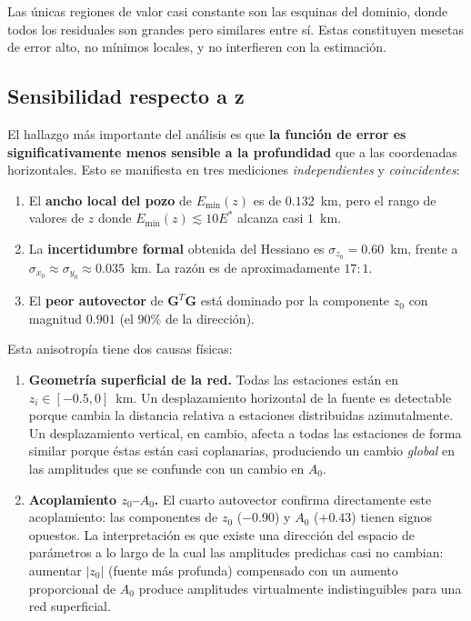 \documentclass[12pt, a4paper]{article}
\begin{document}
Las únicas regiones de valor casi constante son las esquinas del
dominio, donde todos los residuales son grandes pero similares entre
sí. Estas constituyen mesetas de error alto, no mínimos locales, y no
interfieren con la estimación.

\subsection{Sensibilidad respecto a z}
\label{sec:sensibilidad_z}

El hallazgo más importante del análisis es que \textbf{la función de
error es significativamente menos sensible a la profundidad} que a las
coordenadas horizontales. Esto se manifiesta en tres mediciones
\emph{independientes} y \emph{coincidentes}:

\begin{enumerate}[leftmargin=*, itemsep=2pt]
    \item El \textbf{ancho local del pozo} de $E_{\min}(z)$ es de
    $0.132$~km, pero el rango de valores de $z$ donde
    $E_{\min}(z) \lesssim 10 E^*$ alcanza casi $1$~km.
    \item La \textbf{incertidumbre formal} obtenida del Hessiano es
    $\sigma_{z_0} = 0.60$~km, frente a $\sigma_{x_0} \approx
    \sigma_{y_0} \approx 0.035$~km. La razón es de aproximadamente
    $17:1$.
    \item El \textbf{peor autovector} de $\mathbf{G}^T\mathbf{G}$
    está dominado por la componente $z_0$ con magnitud $0.901$ (el
    $90\%$ de la dirección).
\end{enumerate}

Esta anisotropía tiene dos causas físicas:

\begin{enumerate}[leftmargin=*]
    \item \textbf{Geometría superficial de la red.} Todas las
    estaciones están en $z_i \in [-0.5, 0]$~km. Un desplazamiento
    horizontal de la fuente es detectable porque cambia la distancia
    relativa a estaciones distribuidas azimutalmente. Un desplazamiento
    vertical, en cambio, afecta a todas las estaciones de forma similar
    porque éstas están casi coplanarias, produciendo un cambio
    \emph{global} en las amplitudes que se confunde con un cambio en
    $A_0$.

    \item \textbf{Acoplamiento $z_0$--$A_0$.} El cuarto autovector
    confirma directamente este acoplamiento: las componentes de $z_0$
    ($-0.90$) y $A_0$ ($+0.43$) tienen signos opuestos. La interpretación
    es que existe una dirección del espacio de parámetros a lo largo de
    la cual las amplitudes predichas casi no cambian: aumentar $|z_0|$
    (fuente más profunda) compensado con un aumento proporcional de
    $A_0$ produce amplitudes virtualmente indistinguibles para una
    red superficial.
\end{enumerate}
\end{document}
